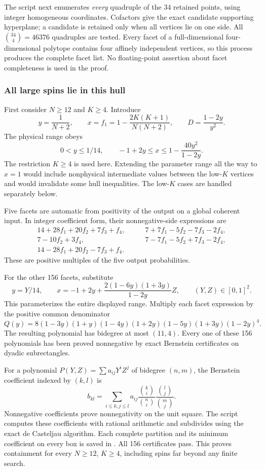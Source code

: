 \documentclass[11pt,a4paper]{article}
\begin{document}
The script next enumerates \emph{every} quadruple of the 34 retained
points, using integer homogeneous coordinates. Cofactors give the
exact candidate supporting hyperplane; a candidate is retained only
when all vertices lie on one side. All $\binom{34}{4}=46376$
quadruples are tested. Every facet of a full-dimensional four-dimensional
polytope contains four affinely independent vertices, so this process
produces the complete facet list. No floating-point assertion about
facet completeness is used in the proof.

\subsubsection{All large spins lie in this hull}
First consider $N\ge12$ and $K\ge4$. Introduce
\[
 y=\frac1{N+2},\qquad x=f_1=1-\frac{2K(K+1)}{N(N+2)},
 \qquad D=\frac{1-2y}{y^2}.
\]
The physical range obeys
\[
 0<y\le1/14,\qquad
 -1+2y\le x\le1-\frac{40y^2}{1-2y}.
\]
The restriction $K\ge4$ is used here. Extending the parameter range
all the way to $x=1$ would include nonphysical intermediate values
between the low-$K$ vertices and would invalidate some hull inequalities.
The low-$K$ cases are handled separately below.

Five facets are automatic from positivity of the output on a global
coherent input. In integer coefficient form, their nonnegative-side
expressions are
\begin{align*}
 14+28f_1+20f_2+7f_3+f_4,&\qquad
 7+7f_1-5f_2-7f_3-2f_4,\\
 7-10f_2+3f_4,&\qquad
 7-7f_1-5f_2+7f_3-2f_4,\\
 14-28f_1+20f_2-7f_3+f_4.&
\end{align*}
These are positive multiples of the five output probabilities.

For the other 156 facets, substitute
\[
 y=Y/14,\qquad
 x=-1+2y+\frac{2(1-6y)(1+3y)}{1-2y}Z,
                \qquad (Y,Z)\in[0,1]^2.
\]
This parameterizes the entire displayed range. Multiply each facet
expression by the positive common denominator
\[
 Q(y)=8(1-3y)(1+y)(1-4y)(1+2y)(1-5y)(1+3y)(1-2y)^4.
\]
The resulting polynomial has bidegree at most $(11,4)$.
Every one of these 156 polynomials has been proved nonnegative by
exact Bernstein certificates on dyadic subrectangles.

For a polynomial $P(Y,Z)=\sum a_{ij}Y^iZ^j$ of bidegree $(n,m)$,
the Bernstein coefficient indexed by $(k,l)$ is
\[
 b_{kl}=\sum_{i\le k,j\le l}a_{ij}
          \frac{\binom{k}{i}}{\binom{n}{i}}
          \frac{\binom{l}{j}}{\binom{m}{j}}.
\]
Nonnegative coefficients prove nonnegativity on the unit square.
The script  computes these
coefficients with rational arithmetic and subdivides using the exact
de Casteljau algorithm. Each complete partition and its minimum
coefficient on every box is saved in .
All 156 certificates pass. This proves containment for every
$N\ge12$, $K\ge4$, including spins far beyond any finite search.
\end{document}
